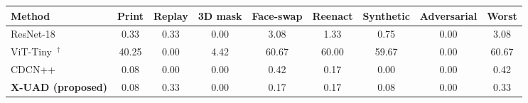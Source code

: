 \begin{tabular}{lcccccccc}
\toprule
Method & Print & Replay & 3D mask & Face-swap & Reenact & Synthetic & Adversarial & Worst \\
\midrule
ResNet-18~\cite{he2016resnet} & 0.33 & 0.33 & 0.00 & 3.08 & 1.33 & 0.75 & 0.00 & 3.08 \\
ViT-Tiny~\cite{dosovitskiy2021vit}$^{\dagger}$ & 40.25 & 0.00 & 4.42 & 60.67 & 60.00 & 59.67 & 0.00 & 60.67 \\
CDCN++~\cite{yu2020cdcn} & 0.08 & 0.00 & 0.00 & 0.42 & 0.17 & 0.00 & 0.00 & 0.42 \\
\textbf{X-UAD (proposed)} & 0.08 & 0.33 & 0.00 & 0.17 & 0.17 & 0.08 & 0.00 & 0.33 \\
\bottomrule
\end{tabular}